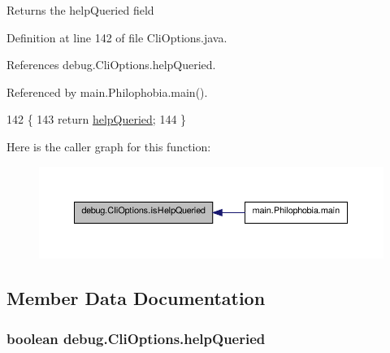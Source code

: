 \begin{DoxyReturn}{Returns}
the help\-Queried field 
\end{DoxyReturn}


Definition at line 142 of file Cli\-Options.\-java.



References debug.\-Cli\-Options.\-help\-Queried.



Referenced by main.\-Philophobia.\-main().


\begin{DoxyCode}
142                                    \{
143         \textcolor{keywordflow}{return} \hyperlink{classdebug_1_1_cli_options_a226c64b5f481ade53599280070c24cf0}{helpQueried};
144     \}
\end{DoxyCode}


Here is the caller graph for this function\-:
\nopagebreak
\begin{figure}[H]
\begin{center}
\leavevmode
\includegraphics[width=350pt]{classdebug_1_1_cli_options_a34dabb4bbc667b0f56bf210749c260bf_icgraph}
\end{center}
\end{figure}




\subsection{Member Data Documentation}
\hypertarget{classdebug_1_1_cli_options_a226c64b5f481ade53599280070c24cf0}{
\subsubsection[{help\-Queried}]{\setlength{\rightskip}{0pt plus 5cm}boolean debug.\-Cli\-Options.\-help\-Queried\hspace{0.3cm}{\ttfamily [protected]}}}\label{classdebug_1_1_cli_options_a226c64b5f481ade53599280070c24cf0}


